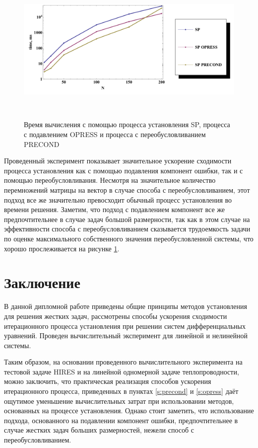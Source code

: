\documentclass[a4paper,14pt]{extreport}
\begin{document}
	\begin{figure}[H]
	\begin{center}
	\includegraphics[height=7.3cm]{pics/num_ex_2_2_3.pdf}
	\caption{\small Время вычисления с помощью процесса установления SP, процесса с подавлением OPRESS и процесса с переобусловливанием PRECOND}
	\label{num_ex_2_2_3}
	\end{center}
	\end{figure}

Проведенный эксперимент показывает значительное ускорение сходимости процесса установления как с помощью подавления компонент ошибки, так и с помощью переобусловливания. Несмотря на значительное количество перемножений матрицы на вектор в случае способа с переобусловливанием, этот подход все же значительно превосходит обычный процесс установления во времени решения. Заметим, что подход с подавлением компонент все же предпочтительнее в случае задач большой размерности, так как в этом случае на эффективности способа с переобусловливанием сказывается трудоемкость задачи по оценке максимального собственного значения переобусловленной системы, что хорошо прослеживается на рисунке \ref{num_ex_2_2_3}.  
  
   \chapter*{Заключение}

В данной дипломной работе приведены общие принципы методов установления для решения жестких задач, рассмотрены способы ускорения сходимости итерационного процесса установления при решении систем дифференциальных уравнений. Проведен вычислительный эксперимент для линейной и нелинейной системы.

Таким образом, на основании проведенного вычислительного эксперимента на тестовой задаче HIRES и на линейной одномерной задаче теплопроводности, можно заключить, что практическая реализация способов ускорения итерационного процесса, приведенных в пунктах \ref{s:precond} и \ref{s:opress} даёт ощутимое уменьшение вычислительных затрат при использовании методов, основанных на процессе установления. Однако стоит заметить, что использование подхода, основанного на подавлении компонент ошибки, предпочтительнее в случае жестких задач больших размерностей, нежели способ с переобусловливанием.
\end{document}
